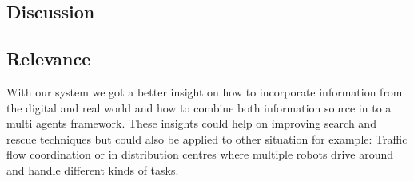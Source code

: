 \subsection{Discussion}
\subsection{Relevance}
With our system we got a better insight on how to incorporate information from the digital and real world and how to combine both information source in to a multi agents framework. These insights could help on improving search and rescue techniques but could also be applied to other situation for example: Traffic flow coordination or in distribution centres where multiple robots drive around and handle different kinds of tasks.  

